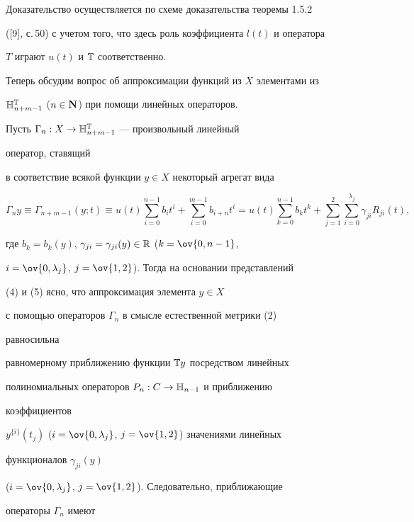  


Доказательство осуществляется по схеме доказательства теоремы 1.5.2 


([9], с.\,50) с учетом того, что здесь роль коэффициента $l(t)$ и оператора 


$T$ играют $u(t)$ и $\Bbb T$ соответственно. 


 


Теперь обсудим вопрос об аппроксимации функций из $X$ элементами из 


$\Bbb H^{\Bbb T}_{n+m-1}$ ($n\in\bold N$) при помощи линейных операторов. 


Пусть $\Gamma_n:X\to\Bbb H^{\Bbb T}_{n+m-1}$ --- произвольный линейный 


оператор, ставящий 


в соответствие всякой функции $y\in X$ некоторый агрегат вида 


\begin{equation} 


\Gamma_n y\equiv\Gamma_{n+m-1}(y;t)\equiv u(t) 


\sum^{n-1}_{i=0}b_i t^i+\sum^{m-1}_{i=0}b_{i+n}t^i= 


u(t)\sum^{n-1}_{k=0}b_k t^k+\sum^2_{j=1}\sum^{\lambda_j}_{i=0} 


\gamma_{j i}R_{j i}(t), 


\end{equation} 


где $b_k=b_k(y)$, $\gamma_{j i}=\gamma_{j i}(y)\in\Bbb R$ ($k=\ov{0,n-1}$, 


$i=\ov{0,\lambda_j}$, $j=\ov{1,2}$). Тогда на основании представлений 


(4) и (5) ясно, что аппроксимация элемента $y\in X$ 


с помощью операторов $\Gamma_n$ в смысле естественной метрики (2) 


равносильна 


равномерному приближению функции $\Bbb T y$ посредством линейных 


полиномиальных операторов $P_n:C\to\Bbb H_{n-1}$ и приближению 


коэффициентов 


$y^{\{i\}}(t_j)$ ($i=\ov{0,\lambda_j}$, $j=\ov{1,2}$) значениями линейных 


функционалов $\gamma_{j i}(y)$ 


($i=\ov{0,\lambda_j}$, $j=\ov{1,2}$). Следовательно, приближающие 


операторы $\Gamma_n$ имеют 


